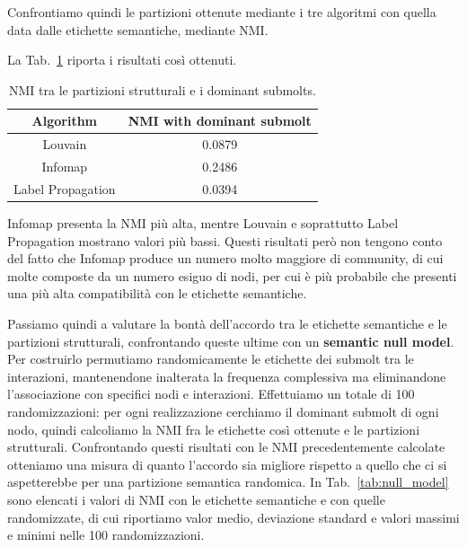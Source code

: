 \documentclass[twocolumn]{article}
\begin{document}
   Confrontiamo quindi le partizioni ottenute mediante i tre algoritmi con quella data dalle etichette semantiche, mediante NMI.

   La Tab.~\ref{tab:semantic_nmi} riporta i risultati così ottenuti.


   \begin{table}[htb]
      \centering
      \begin{tabular}{|c|c|}
         \hline
         Algorithm & NMI with dominant submolt \\
         \hline
         Louvain & 0.0879 \\
         Infomap & 0.2486 \\
         Label Propagation & 0.0394 \\
         \hline
      \end{tabular}
      \caption{NMI tra le partizioni strutturali e i dominant submolts.}
      \label{tab:semantic_nmi}
   \end{table}

   Infomap presenta la NMI più alta, mentre Louvain e soprattutto Label Propagation mostrano valori più bassi. Questi risultati però non tengono conto del fatto che Infomap produce un numero molto maggiore di community, di cui molte composte da un numero esiguo di nodi, per cui è più probabile che presenti una più alta compatibilità con le etichette semantiche.

   Passiamo quindi a valutare la bontà dell'accordo tra le etichette semantiche e le partizioni strutturali, confrontando queste ultime con un \textbf{semantic null model}.
   Per costruirlo permutiamo randomicamente le etichette dei submolt tra le interazioni, mantenendone inalterata la frequenza complessiva ma eliminandone l'associazione con specifici nodi e interazioni. 
   Effettuiamo un totale di 100 randomizzazioni: per ogni realizzazione cerchiamo il dominant submolt di ogni nodo, quindi calcoliamo la NMI fra le etichette così ottenute e le partizioni strutturali.
   Confrontando questi risultati con le NMI precedentemente calcolate otteniamo una misura di quanto l'accordo sia migliore rispetto a quello che ci si aspetterebbe per una partizione semantica randomica.
   In Tab.~\ref{tab:null_model} sono elencati i valori di NMI con le etichette semantiche e con quelle randomizzate, di cui riportiamo valor medio, deviazione standard e valori massimi e minimi nelle 100 randomizzazioni.
\end{document}
